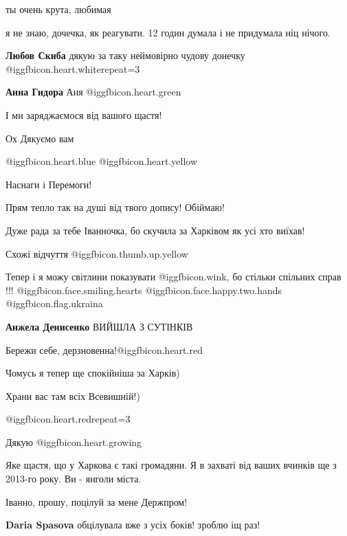 \begin{itemize}
ты очень крута, любимая

я не знаю, дочечка, як реагувати. 12 годин думала і не придумала ніц нічого.

\textbf{Любов Скиба} дякую за таку неймовірно чудову донечку @igg{fbicon.heart.white}{repeat=3} 

\textbf{Анна Гидора} Аня  @igg{fbicon.heart.green} 

І ми заряджаємося від вашого щастя!

Ох Дякуємо вам 

 @igg{fbicon.heart.blue}  @igg{fbicon.heart.yellow} 

Наснаги і Перемоги!

Прям тепло так на душі від твого допису! Обіймаю!

Дуже рада за тебе Іванночка, бо скучила за Харківом як усі хто виїхав!

Схожі відчуття  @igg{fbicon.thumb.up.yellow} 


Тепер і я можу світлини показувати  @igg{fbicon.wink}, бо стільки спільних
справ !!!  @igg{fbicon.face.smiling.hearts}  @igg{fbicon.face.happy.two.hands}
@igg{fbicon.flag.ukraina}

\textbf{Анжела Денисенко} ВИЙШЛА З СУТІНКІВ

Бережи себе, дерзновенна!@igg{fbicon.heart.red}

Чомусь я тепер ще спокійніша за Харків)

Храни вас там всіх Всевишній!)

@igg{fbicon.heart.red}{repeat=3}

Дякую @igg{fbicon.heart.growing} 


Яке щастя, що у Харкова є такі громадяни. Я в захваті від ваших вчинків ще з
2013-го року. Ви - янголи міста.

Іванно, прошу, поцілуй за мене Держпром!

\textbf{Daria Spasova} обцілувала вже з усіх боків! зроблю іщ раз!


\end{itemize}
